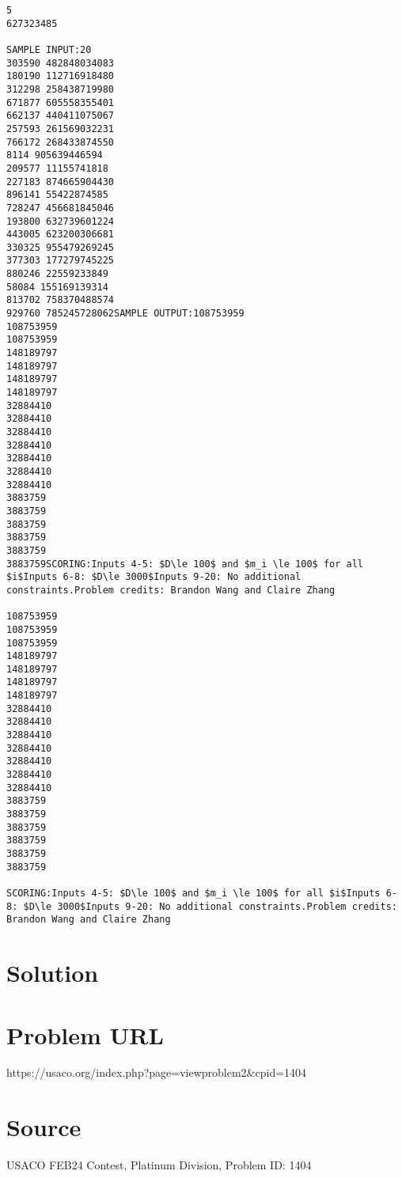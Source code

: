 \documentclass[12pt]{article}
\begin{document}
\begin{verbatim}
5
627323485

SAMPLE INPUT:20
303590 482848034083
180190 112716918480
312298 258438719980
671877 605558355401
662137 440411075067
257593 261569032231
766172 268433874550
8114 905639446594
209577 11155741818
227183 874665904430
896141 55422874585
728247 456681845046
193800 632739601224
443005 623200306681
330325 955479269245
377303 177279745225
880246 22559233849
58084 155169139314
813702 758370488574
929760 785245728062SAMPLE OUTPUT:108753959
108753959
108753959
148189797
148189797
148189797
148189797
32884410
32884410
32884410
32884410
32884410
32884410
32884410
3883759
3883759
3883759
3883759
3883759
3883759SCORING:Inputs 4-5: $D\le 100$ and $m_i \le 100$ for all $i$Inputs 6-8: $D\le 3000$Inputs 9-20: No additional constraints.Problem credits: Brandon Wang and Claire Zhang

108753959
108753959
108753959
148189797
148189797
148189797
148189797
32884410
32884410
32884410
32884410
32884410
32884410
32884410
3883759
3883759
3883759
3883759
3883759
3883759

SCORING:Inputs 4-5: $D\le 100$ and $m_i \le 100$ for all $i$Inputs 6-8: $D\le 3000$Inputs 9-20: No additional constraints.Problem credits: Brandon Wang and Claire Zhang
\end{verbatim}

\section*{Solution}


\section*{Problem URL}
https://usaco.org/index.php?page=viewproblem2&cpid=1404

\section*{Source}
USACO FEB24 Contest, Platinum Division, Problem ID: 1404
\end{document}

